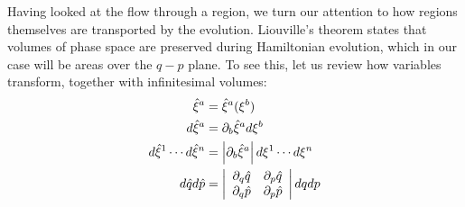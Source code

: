 Having looked at the flow through a region, we turn our attention to how regions themselves are transported by the evolution. Liouville's theorem states that volumes of phase space are preserved during Hamiltonian evolution, which in our case will be areas over the $q-p$ plane. To see this, let us review how variables transform, together with infinitesimal volumes:
\begin{equation}\label{rp-cm-volumeTransformation1d}
	\begin{aligned}
		\hat{\xi}^a &= \hat{\xi}^a(\xi^b) \\
		d\hat{\xi}^a &= \partial_b \hat{\xi}^a d\xi^b \\
		d\hat{\xi}^1 \cdots d\hat{\xi}^n &= \left| \partial_b \hat{\xi}^a \right| d\xi^1 \cdots d\xi^n \\
		d\hat{q} d\hat{p} &= \left|\begin{array}{ c c }
			\partial_q \hat{q} & \partial_p \hat{q} \\
			\partial_q \hat{p} & \partial_p \hat{p} \\
		\end{array} \right| dq dp \\
	\end{aligned}	
\end{equation}

